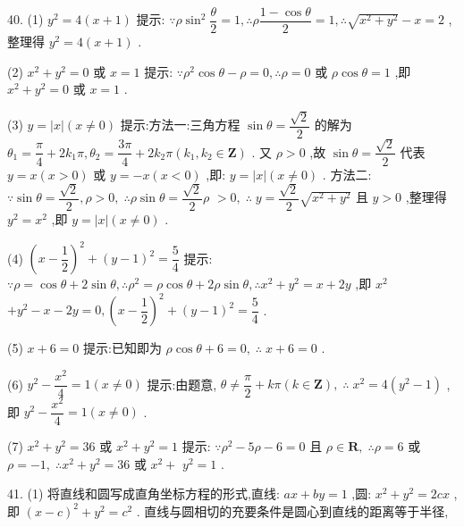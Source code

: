 40. (1) ${y}^{2} = 4\left( {x + 1}\right)$ 提示: $\because \rho {\sin }^{2}\dfrac{\theta }{2} = 1,\therefore \rho \dfrac{1 - \cos \theta }{2} = 1,\therefore \sqrt{{x}^{2} + {y}^{2}} - x = 2$ ,整理得 ${y}^{2} = 4\left( {x + 1}\right)$ .

(2) ${x}^{2} + {y}^{2} = 0$ 或 $x = 1$ 提示: $\because {\rho }^{2}\cos \theta  - \rho  = 0,\therefore \rho  = 0$ 或 $\rho \cos \theta  = 1$ ,即 ${x}^{2} + {y}^{2} = 0$ 或 $x = 1$ .

(3) $y = \left| x\right| \left( {x \neq  0}\right)$ 提示:方法一:三角方程 $\sin \theta  = \dfrac{\sqrt{2}}{2}$ 的解为 ${\theta }_{1} = \dfrac{\pi }{4} + 2{k}_{1}\pi ,{\theta }_{2} = \dfrac{3\pi }{4} + 2{k}_{2}\pi \left( {{k}_{1},{k}_{2} \in  \mathbf{Z}}\right)$ . 又 $\rho  > 0$ ,故 $\sin \theta  = \dfrac{\sqrt{2}}{2}$ 代表 $y = x\left( {x > 0}\right)$ 或 $y =  - x\left( {x < 0}\right)$ ,即: $y = \left| x\right| \left( {x \neq  0}\right)$ . 方法二: $\because \sin \theta  = \dfrac{\sqrt{2}}{2},\rho  > 0,\;\therefore \rho \sin \theta  = \dfrac{\sqrt{2}}{2}\rho$  $> 0,\;\therefore \;y = \dfrac{\sqrt{2}}{2}\sqrt{{x}^{2} + {y}^{2}}$ 且 $y > 0$ ,整理得 ${y}^{2} = {x}^{2}$ ,即 $y = \left| x\right| \left( {x \neq  0}\right)$ .

(4) ${\left( x - \dfrac{1}{2}\right) }^{2} + {\left( y - 1\right) }^{2} = \dfrac{5}{4}$ 提示: $\because \rho  = \cos \theta  + 2\sin \theta ,\therefore {\rho }^{2} = \rho \cos \theta  + {2\rho }\sin \theta ,\therefore {x}^{2} + {y}^{2} = x + {2y}$ ,即 ${x}^{2}$  $+ {y}^{2} - x - {2y} = 0,{\left( x - \dfrac{1}{2}\right) }^{2} + {\left( y - 1\right) }^{2} = \dfrac{5}{4}$ .

(5) $x + 6 = 0$ 提示:已知即为 $\rho \cos \theta  + 6 = 0,\;\therefore \;x + 6 = 0$ .

(6) ${y}^{2} - \dfrac{{x}^{2}}{4} = 1\left( {x \neq  0}\right)$ 提示:由题意, $\theta  \neq  \dfrac{\pi }{2} + {k\pi }\left( {k \in  \mathbf{Z}}\right) ,\;\therefore \;{x}^{2} = 4\left( {{y}^{2} - 1}\right)$ ,即 ${y}^{2} - \dfrac{{x}^{2}}{4} = 1\left( {x \neq  0}\right)$ .

(7) ${x}^{2} + {y}^{2} = {36}$ 或 ${x}^{2} + {y}^{2} = 1$ 提示: $\because {\rho }^{2} - {5\rho } - 6 = 0$ 且 $\rho  \in  \mathbf{R},\;\therefore \rho  = 6$ 或 $\rho  =  - 1,\;\therefore {x}^{2} + {y}^{2} = {36}$ 或 ${x}^{2} +$  ${y}^{2} = 1$ .

41. (1) 将直线和圆写成直角坐标方程的形式,直线: ${ax} + {by} = 1$ ,圆: ${x}^{2} + {y}^{2} = {2cx}$ ,即 ${\left( x - c\right) }^{2} + {y}^{2} = {c}^{2}$ . 直线与圆相切的充要条件是圆心到直线的距离等于半径,

